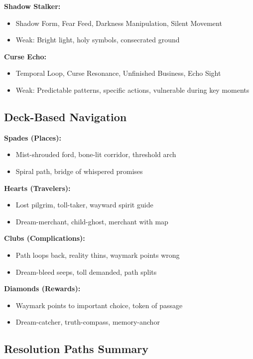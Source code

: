 \documentclass[11pt]{article}
\begin{document}
\textbf{Shadow Stalker:}
\begin{itemize}
\item Shadow Form, Fear Feed, Darkness Manipulation, Silent Movement
\item Weak: Bright light, holy symbols, consecrated ground
\end{itemize}

\textbf{Curse Echo:}
\begin{itemize}
\item Temporal Loop, Curse Resonance, Unfinished Business, Echo Sight
\item Weak: Predictable patterns, specific actions, vulnerable during key moments
\end{itemize}

\subsection*{Deck-Based Navigation}

\textbf{Spades (Places):}
\begin{itemize}
\item Mist-shrouded ford, bone-lit corridor, threshold arch
\item Spiral path, bridge of whispered promises
\end{itemize}

\textbf{Hearts (Travelers):}
\begin{itemize}
\item Lost pilgrim, toll-taker, wayward spirit guide
\item Dream-merchant, child-ghost, merchant with map
\end{itemize}

\textbf{Clubs (Complications):}
\begin{itemize}
\item Path loops back, reality thins, waymark points wrong
\item Dream-bleed seeps, toll demanded, path splits
\end{itemize}

\textbf{Diamonds (Rewards):}
\begin{itemize}
\item Waymark points to important choice, token of passage
\item Dream-catcher, truth-compass, memory-anchor
\end{itemize}

\subsection*{Resolution Paths Summary}
\end{document}
